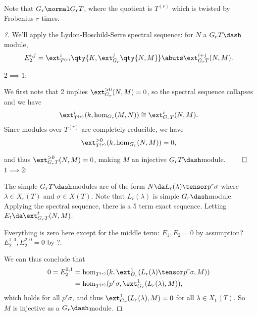 Note that \(G_r \normal G_r T\), where the quotient is \(T^{(r)}\) which
is twisted by Frobenius \(r\) times.

\begin{proof}[?]

We'll apply the Lydon-Hoschild-Serre spectral sequence: for \(N\) a
\(G_r T\dash\)module,
\begin{align*}  
E_2^{i, j} = \ext_{T^{(r)}}^{i}\qty{K, \ext_{G_r}^j\qty{N, M} } \abuts \ext_{G_r T}^{i+j}(N, M)
.\end{align*}

\(2\implies 1\):

We first note that 2 implies \(\ext_{G_r}^{>0}(N, M) = 0\), so the
spectral sequence collapses and we have
\begin{align*}  
\ext_{T^{(r)}}^i (k, \hom_{G_r}(M, N) ) \cong \ext_{G_r T}^i(N, M)
.\end{align*} Since modules over \(T^{(r)}\) are completely reducible,
we have
\begin{align*}  
\ext_{T^{(r)}}^{>0} ( k, \hom_{G_r}(N, M) ) = 0
,\end{align*}

and thus \(\ext_{G_r T}^{>0}(N, M) = 0\), making \(M\) an injective
\(G_r T\dash\)module. \(\qed\)\\

\(1\implies 2\):

The simple \(G_r T\dash\)modules are of the form
\(N\da L_r(\lambda) \tensor p^r\sigma\) where \(\lambda\in X_r(T)\) and
\(\sigma\in X(T)\). Note that \(L_r(\lambda)\) is simple
\(G_r\dash\)module. Applying the spectral sequence, there is a 5 term
exact sequence. Letting \(E_t \da \ext_{G_rT}^t (N, M)\).

\begin{center}
\end{center}

Everything is zero here except for the middle term: \(E_1, E_2 = 0\) by
assumption? \(E_2^{1, 0}, E_2^{2, 0} = 0\) by ?.

We can thus conclude that
\begin{align*}  
0 = E_2^{0, 1}
&= \hom_{T^{(r)}}(k, \ext_{G_r}^1 (L_r(\lambda) \tensor p^r\sigma, M)  ) \\ 
&= \hom_{T^{(r)}}(p^r\sigma, \ext_{G_r}^1 (L_r(\lambda), M)  ) 
,\end{align*} which holds for all \(p^r \sigma\), and thus
\(\ext_{G_r}^1 (L_r(\lambda), M) = 0\) for all \(\lambda\in X_1(T)\). So
\(M\) is injective as a \(G_r\dash\)module.

\end{proof}

